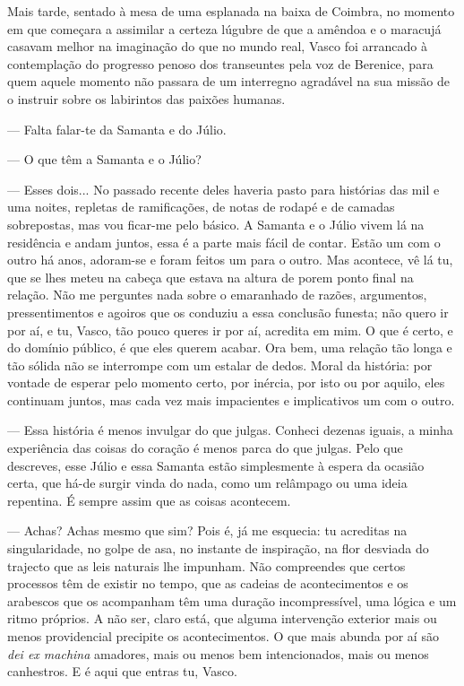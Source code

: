 Mais tarde, sentado à mesa de uma esplanada na baixa de Coimbra, no
momento em que começara a assimilar a certeza lúgubre de que a amêndoa e
o maracujá casavam melhor na imaginação do que no mundo real, Vasco foi
arrancado à contemplação do progresso penoso dos transeuntes pela voz
de Berenice, para quem aquele momento não passara de um interregno
agradável na sua missão de o instruir sobre os labirintos das paixões
humanas.

--- Falta falar-te da Samanta e do Júlio.

--- O que têm a Samanta e o Júlio?

--- Esses dois... No passado recente deles haveria pasto para histórias
  das mil e uma noites, repletas de ramificações, de notas de rodapé e
  de camadas sobrepostas, mas vou ficar-me pelo básico. A Samanta e o Júlio vivem lá na residência e andam
juntos, essa é a parte mais fácil de contar. Estão um com o outro há
anos, adoram-se e foram feitos um para o outro. Mas acontece, vê lá tu,
que se lhes meteu na cabeça que estava na altura de porem ponto final na
relação. Não me perguntes nada sobre o emaranhado de razões, argumentos,
pressentimentos e agoiros que os conduziu a essa conclusão funesta; não
quero ir por aí, e tu, Vasco, tão pouco queres ir por aí, acredita em
mim. O que é certo, e do domínio público, é que eles querem acabar. Ora
bem, uma relação tão longa e tão sólida não se interrompe com um estalar
de dedos. Moral
da história: por vontade de esperar pelo momento certo, por inércia, por
isto ou por aquilo, eles continuam juntos, mas cada vez mais impacientes
e implicativos um com o outro.

--- Essa história é menos invulgar do que julgas. Conheci dezenas iguais,
  a minha experiência das coisas do coração é menos parca do que julgas.
  Pelo que descreves, esse Júlio e essa Samanta estão simplesmente à
  espera da ocasião certa, que há-de surgir vinda do nada, como um relâmpago ou uma ideia repentina. É
sempre assim que as coisas acontecem.

--- Achas? Achas mesmo que sim? Pois é, já me esquecia: tu acreditas na
  singularidade, no golpe de asa, no instante de inspiração, na flor
  desviada do trajecto que as leis naturais lhe impunham. Não
  compreendes que certos processos têm de existir no tempo, que as
  cadeias de acontecimentos e os arabescos que os acompanham têm uma
  duração incompressível, uma lógica e um ritmo próprios. A não ser,
  claro está, que alguma intervenção exterior mais ou menos providencial
  precipite os acontecimentos. O que mais abunda por aí são \emph{dei ex
  machina }amadores, mais ou menos bem intencionados, mais ou menos
  canhestros. E é aqui que entras tu, Vasco.

